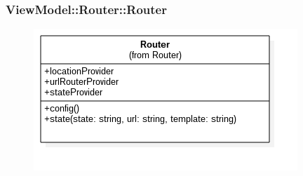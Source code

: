 \subsubsection{ViewModel::Router::Router}
\begin{figure}[h!]
\begin{center}
	\includegraphics[scale=0.4]{../images/ViewModel/Router/Router.png}
\end{center}
\end{figure}
